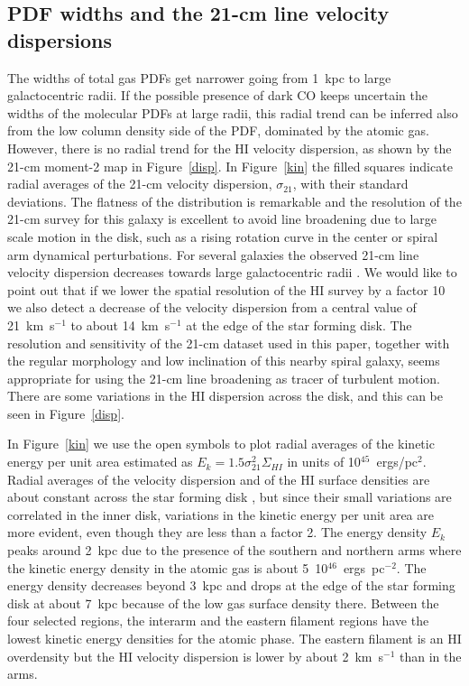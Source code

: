 \documentclass{aa}
\begin{document}
 
\subsection{PDF widths and the 21-cm line velocity dispersions}

The widths of total gas PDFs get narrower going from 1~kpc to large galactocentric radii.
If  the possible presence of  dark CO keeps uncertain  the widths of the molecular PDFs at
large radii, this radial trend can be inferred also from the low column density side of the PDF, 
dominated by the atomic gas.
However, there is no radial trend for the HI velocity dispersion, as shown by 
the 21-cm  moment-2 map in Figure~\ref{disp}. In Figure~\ref{kin} the filled
squares indicate radial averages of the 21-cm velocity dispersion, $\sigma_{21}$,
with their standard deviations. The flatness of the distribution is remarkable and the
resolution of the 21-cm survey for this galaxy is excellent to avoid line broadening 
due to large scale motion in the disk, such as a  rising  rotation curve in the center or spiral arm
dynamical perturbations. For  several galaxies the observed 21-cm line velocity dispersion decreases towards
large galactocentric radii \citep{2009AJ....137.4424T}. We would like to point out   that if
we lower the spatial resolution of the HI survey by a factor 10 we also detect a decrease of the
velocity dispersion from a central value of 21~km~s$^{-1}$  to  about 14~km~s$^{-1}$ at the edge of the 
star forming disk. The resolution and sensitivity of the 21-cm dataset used in this paper, 
together with the regular morphology and low inclination of this nearby spiral galaxy, seems 
appropriate for using the 21-cm line broadening
as tracer of turbulent motion. There are  some
variations in the HI dispersion across the disk, and this can be seen in
Figure~\ref{disp}. 
 
 In Figure~\ref{kin} we use the
open symbols to plot radial averages of the kinetic energy per unit area estimated
as $E_k=1.5 \sigma_{21}^2 \Sigma_{HI}$ in units of 10$^{45}$~ergs/pc$^2$.  Radial
averages of the velocity dispersion  and of the HI surface densities are about
constant across the star forming disk \citep{2014A&A...572A..23C}, but since their
small variations are correlated in the inner disk,  variations in the
kinetic energy per unit area  are more evident, even though  they are less
than a factor 2. The energy density $E_k$ peaks around 2~kpc  due to the presence of the southern and
northern arms where the kinetic energy  density in the atomic gas is about
5~10$^{46}$~ergs~pc$^{-2}$. The energy  density decreases beyond 3~kpc and
drops at the edge of the star forming disk at about 7~kpc  because  of the low gas
surface density there.  Between the four selected regions, the interarm  and the
eastern filament regions have the lowest  kinetic energy densities for the
atomic phase. The eastern filament is an HI overdensity but the HI velocity dispersion is
lower by about 2~km~s$^{-1}$ than in the arms.
\end{document}
